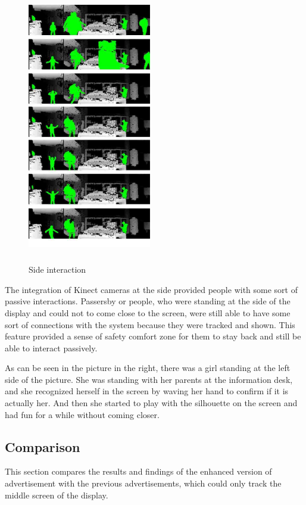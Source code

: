\begin{figure}
  \vspace{-30pt}
  \begin{center}
    \includegraphics[width=0.48\textwidth,height=120mm]{Figures/9/effects/playing}
  \end{center}
  \vspace{-20pt}
  \caption{Side interaction}
  \vspace{-60pt}
\end{figure}
The integration of Kinect cameras at the side provided people with some sort of passive interactions. Passersby or people, who were standing at the side of the display and could not to come close to the screen, were still able to have some sort of connections with the system because they were tracked and shown. This feature provided a sense of safety comfort zone for them to stay back and still be able to interact passively. 

As can be seen in the picture in the right, there was a girl standing at the left side of the picture. She was standing with her parents at the information desk, and she recognized herself in the screen by waving her hand to confirm if it is actually her. And then she started to play with the silhouette on the screen and had fun for a while without coming closer.
\break
\break
\break
\break

\subsection{Comparison}
This section compares the results and findings of the enhanced version of advertisement with the previous advertisements, which could only track the middle screen of the display. 

